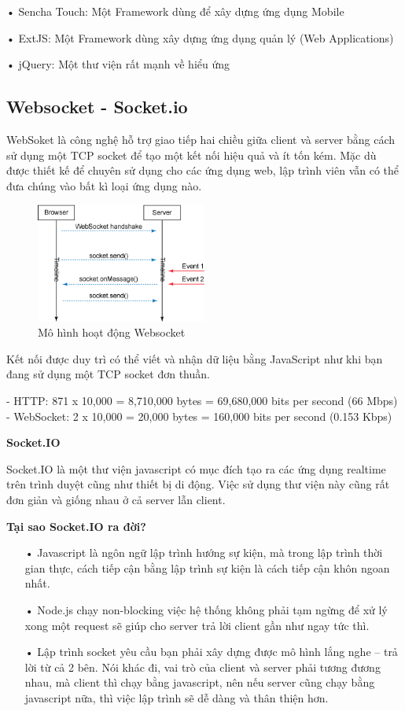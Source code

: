 • Sencha Touch: Một Framework  dùng để xây dựng ứng dụng Mobile

• ExtJS: Một Framework dùng xây dựng ứng dụng quản lý (Web Applications)

• jQuery: Một thư viện rất mạnh về hiểu ứng

\subsection{Websocket - Socket.io}
WebSoket là công nghệ hỗ trợ giao tiếp hai chiều giữa client và server bằng cách sử dụng một TCP socket để tạo một kết nối hiệu quả và ít tốn kém. Mặc dù được thiết kế để chuyên sử dụng cho các ứng dụng web, lập trình viên vẫn có thể đưa chúng vào bất kì loại ứng dụng nào.
\begin{figure}[H]
	\centering    
	\includegraphics[width=0.5\textwidth]{websk}
	\caption[Mô hình hoạt động Websocket]{Mô hình hoạt động Websocket}
	\label{fig: websk}
\end{figure}

Kết nối được duy trì có thể viết và nhận dữ liệu bằng JavaScript như khi bạn đang sử dụng một TCP socket đơn thuần.

- HTTP: 871 x 10,000 = 8,710,000 bytes = 69,680,000 bits per second (66 Mbps)
- WebSocket: 2 x 10,000 = 20,000 bytes = 160,000 bits per second (0.153 Kbps)


\textbf{Socket.IO}

Socket.IO là một thư viện javascript có mục đích tạo ra các ứng dụng realtime trên trình duyệt cũng như thiết bị di động. Việc sử dụng thư viện này cũng rất đơn giản và giống nhau ở cả server lẫn client. 

\textbf{Tại sao Socket.IO ra đời?}

\begin{itemize}
\item[•]Javascript là ngôn ngữ lập trình hướng sự kiện, mà trong lập trình thời gian thực, cách tiếp cận bằng lập trình sự kiện là cách tiếp cận khôn ngoan nhất.
\item[•]Node.js chạy non-blocking việc hệ thống không phải tạm ngừng để xử lý xong một request sẽ giúp cho server trả lời client gần như ngay tức thì.
\item[•]Lập trình socket yêu cầu bạn phải xây dựng được mô hình lắng nghe – trả lời từ cả 2 bên. Nói khác đi, vai trò của client và server phải tương đương nhau, mà client thì chạy bằng javascript, nên nếu server cũng chạy bằng javascript nữa, thì việc lập trình sẽ dễ dàng và thân thiện hơn.
\end{itemize}

